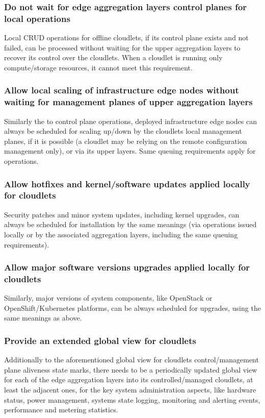 \documentclass[conference]{IEEEtran}
\begin{document}
\subsubsection{Do not wait for edge aggregation layers control planes for local
operations}
Local CRUD operations for offline cloudlets, if its control plane exists and
not failed, can be processed without waiting for the upper aggregation layers
to recover its control over the cloudlets. When a cloudlet is running only
compute/storage resources, it cannot meet this requirement.

\subsubsection{Allow local scaling of infrastructure edge nodes without waiting
for management planes of upper aggregation layers}
Similarly the to control plane operations, deployed infrastructure edge nodes
can always be scheduled for scaling up/down by the cloudlets local management
planes, if it is possible (a cloudlet may be relying on the remote
configuration management only), or via its upper layers. Same queuing
requirements apply for operations.

\subsubsection{Allow hotfixes and kernel/software updates applied locally for
cloudlets}
Security patches and minor system updates, including kernel upgrades, can
always be scheduled for installation by the same meanings (via operations
issued locally or by the associated aggregation layers, including the same
queuing requirements).

\subsubsection{Allow major software versions upgrades applied locally for
cloudlets}
Similarly, major versions of system components, like OpenStack or
OpenShift/Kubernetes platforms, can be always scheduled for upgrades, using the
same meanings as above.

\subsubsection{Provide an extended global view for cloudlets}
Additionally to the aforementioned global view for cloudlets control/management
plane aliveness state marks, there needs to be a periodically updated global
view for each of the edge aggregation layers into its controlled/managed
cloudlets, at least the adjacent ones, for the key system administration
aspects, like hardware status, power management, systems state logging,
monitoring and alerting events, performance and metering statistics.
\end{document}
